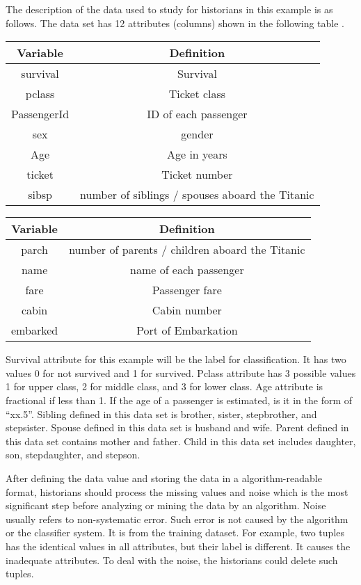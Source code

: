\documentclass[sigconf]{acmart}
\begin{document}
\par
The description of the data used to study for historians in this example is as follows. The data set has 12 attributes (columns) shown in the following table \cite{C3}. 

\begin{center}
\begin{tabular}{c|c}
\hline
Variable & Definition\\
\hline
survival & Survival\\
pclass & Ticket class\\
PassengerId & ID of each passenger \\
sex & gender   \\
Age & Age in years   \\
ticket & Ticket number  \\
sibsp & number of siblings / spouses aboard the Titanic  \\
\hline
\end{tabular}
\end{center}

\begin{center}
\begin{tabular}{c|c}
\hline
Variable & Definition\\
\hline
parch & number of parents / children aboard the Titanic   \\
name & name of each passenger \\
fare &  Passenger fare	  \\
cabin &  Cabin number   \\
embarked &  Port of Embarkation \\
\hline
\end{tabular}
\end{center}

\par 
Survival attribute for this example will be the label for classification. It has two values 0 for not survived and 1 for survived. Pclass attribute has 3 possible values 1 for upper class, 2 for middle class, and 3 for lower class. Age attribute is fractional if less than 1. If the age of a passenger is estimated, is it in the form of ``xx.5''. Sibling defined in this data set is brother, sister, stepbrother, and stepsister. Spouse defined in this data set is husband and wife. Parent defined in this data set contains mother and father. Child in this data set includes daughter, son, stepdaughter, and stepson\cite{C3}. 

\par 
After defining the data value and storing the data in a algorithm-readable format, historians should process the missing values and noise which is the most significant step before analyzing or mining the data by an algorithm. Noise usually refers to non-systematic error. Such error is not caused by the algorithm or the classifier system. It is from the training dataset. For example, two tuples has the identical values in all attributes, but their label is different. It causes the inadequate attributes. To deal with the noise, the historians could delete such tuples. 
\end{document}
